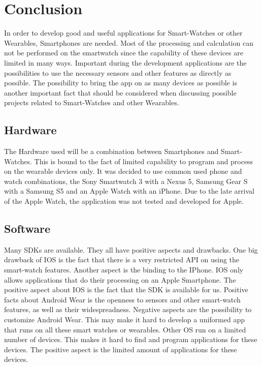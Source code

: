 \section{Conclusion}

In order to develop good and useful applications for Smart-Watches or other Wearables, Smartphones are needed. Most of the processing and calculation can not be performed on the smartwatch since the capability of these devices are limited in many ways.
Important during the development applications are the possibilities to use the necessary sensors and other features as directly as possible. 
The possibility to bring the app on as many devices as possible is another important fact that should be considered when discussing possible projects related to Smart-Watches and other Wearables. 

\subsection{Hardware}
The Hardware used will be a combination between Smartphones and Smart-Watches. This is bound to the fact of limited capability to program and process on the wearable devices only. It was decided to use common used phone and watch combinations, the Sony Smartwatch 3 with a Nexus 5, Samsung Gear S with a Samsung S5 and an Apple Watch with an iPhone. Due to the late arrival of the Apple Watch, the application was not tested and developed for Apple.

\subsection{Software}
Many SDKs are available. They all have positive aspects and drawbacks. 
One big drawback of IOS is the fact that there is a very restricted API on using the smart-watch features. Another aspect is the binding to the IPhone. IOS only allows applications that do their processing on an Apple Smartphone.
The positive aspect about IOS is the fact that the SDK is available for us.
Positive facts about Android Wear is the openness to sensors and other smart-watch features, as well as their widespreadness. 
Negative aspects are the possibility to customize Android Wear. This may make it hard to develop a uniformed app that runs on all these smart watches or wearables. 
Other OS run on a limited number of devices. This makes it hard to find and program applications for these devices. The positive aspect is the limited amount of applications for these devices. 